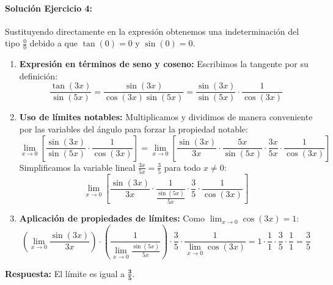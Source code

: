 \documentclass[11pt,letterpaper]{article}
\begin{document}
\paragraph{Solución Ejercicio 4:}
Sustituyendo directamente en la expresión obtenemos una indeterminación del tipo $\frac{0}{0}$ debido a que $\tan(0) = 0$ y $\sin(0) = 0$.
\begin{enumerate}
    \item \textbf{Expresión en términos de seno y coseno:} Escribimos la tangente por su definición:
    $$\frac{ \tan(3x) }{ \sin(5x) } = \frac{ \sin(3x) }{ \cos(3x)\sin(5x) } = \frac{\sin(3x)}{\sin(5x)} \cdot \frac{1}{\cos(3x)}$$
    \item \textbf{Uso de límites notables:} Multiplicamos y dividimos de manera conveniente por las variables del ángulo para forzar la propiedad notable:
    $$\lim_{x\to 0} \left[ \frac{\sin(3x)}{\sin(5x)} \cdot \frac{1}{\cos(3x)} \right] = \lim_{x\to 0} \left[ \frac{\sin(3x)}{3x} \cdot \frac{5x}{\sin(5x)} \cdot \frac{3x}{5x} \cdot \frac{1}{\cos(3x)} \right]$$
    Simplificamos la variable lineal $\frac{3x}{5x} = \frac{3}{5}$ para todo $x \neq 0$:
    $$\lim_{x\to 0} \left[ \frac{\sin(3x)}{3x} \cdot \frac{1}{\frac{\sin(5x)}{5x}} \cdot \frac{3}{5} \cdot \frac{1}{\cos(3x)} \right]$$
    \item \textbf{Aplicación de propiedades de límites:} Como $\lim_{x\to 0} \cos(3x) = 1$:
    $$\left( \lim_{x\to 0} \frac{\sin(3x)}{3x} \right) \cdot \left( \frac{1}{\lim_{x\to 0} \frac{\sin(5x)}{5x}} \right) \cdot \frac{3}{5} \cdot \frac{1}{\lim_{x\to 0} \cos(3x)} = 1 \cdot \frac{1}{1} \cdot \frac{3}{5} \cdot \frac{1}{1} = \frac{3}{5}$$
\end{enumerate}
\textbf{Respuesta:} El límite es igual a $\mathbf{\frac{3}{5}}$.
\end{document}
